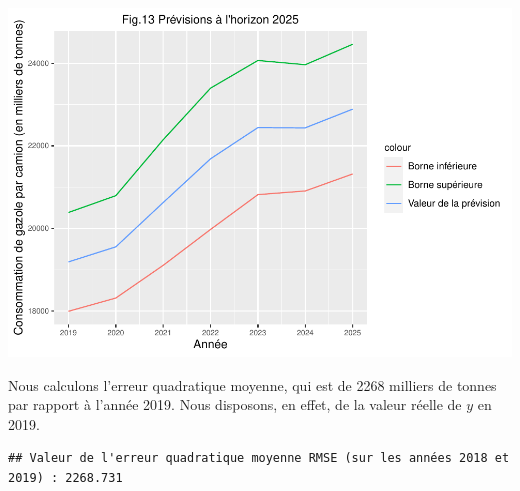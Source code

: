 \documentclass[
]{article}
\newenvironment{Shaded}{\begin{snugshade}}{\end{snugshade}}
\newcommand{\DecValTok}[1]{\textcolor[rgb]{0.00,0.00,0.81}{#1}}
\newcommand{\FunctionTok}[1]{\textcolor[rgb]{0.00,0.00,0.00}{#1}}
\newcommand{\NormalTok}[1]{#1}
\newcommand{\OtherTok}[1]{\textcolor[rgb]{0.56,0.35,0.01}{#1}}
\newcommand{\SpecialCharTok}[1]{\textcolor[rgb]{0.00,0.00,0.00}{#1}}
\newcommand{\StringTok}[1]{\textcolor[rgb]{0.31,0.60,0.02}{#1}}
\begin{document}
\includegraphics{Projet_econometrie_II_files/figure-latex/unnamed-chunk-20-1.pdf}

Nous calculons l'erreur quadratique moyenne, qui est de 2268 milliers de
tonnes par rapport à l'année 2019. Nous disposons, en effet, de la
valeur réelle de \(y\) en 2019.

\begin{Shaded}
\end{Shaded}

\begin{verbatim}
## Valeur de l'erreur quadratique moyenne RMSE (sur les années 2018 et 2019) : 2268.731
\end{verbatim}

\printbibliography[title=Bibliographie]
\end{document}
